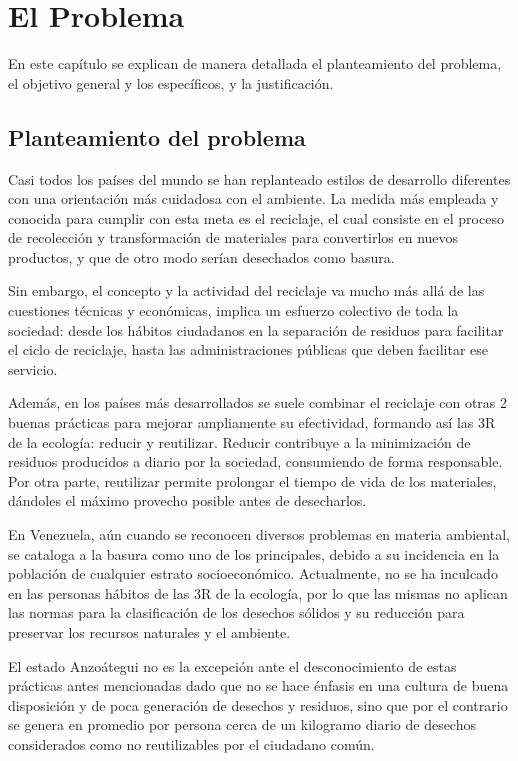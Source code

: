 \vspace*{6cm}
{\setlength{\parskip}{-0.5cm}
\chapter{El Problema}
}
\newpage

En este capítulo se explican de manera detallada el planteamiento del problema, el objetivo general y los específicos, y la justificación.

{\setlength{\parskip}{0cm}

\section{Planteamiento del problema}

Casi todos los países del mundo se han replanteado estilos de desarrollo diferentes con una orientación más cuidadosa con el ambiente. La medida más empleada y conocida para cumplir con esta meta es el reciclaje, el cual consiste en el proceso de recolección y transformación de materiales para convertirlos en nuevos productos, y que de otro modo serían desechados como basura.
}
Sin embargo, el concepto y la actividad del reciclaje va mucho más allá de las cuestiones técnicas y económicas, implica un esfuerzo colectivo de toda la sociedad: desde los hábitos ciudadanos en la separación de residuos para facilitar el ciclo de reciclaje, hasta las administraciones públicas que deben facilitar ese servicio. 

Además, en los países más desarrollados se suele combinar el reciclaje con otras 2 buenas prácticas para mejorar ampliamente su efectividad, formando así las 3R de la ecología: reducir y reutilizar. Reducir contribuye a la minimización de residuos producidos a diario por la sociedad, consumiendo de forma responsable. Por otra parte, reutilizar permite prolongar el tiempo de vida de los materiales, dándoles el máximo provecho posible antes de desecharlos.

En Venezuela, aún cuando se reconocen diversos problemas en materia ambiental, se cataloga a la basura como uno de los principales, debido a su incidencia en la población de cualquier estrato socioeconómico. Actualmente, no se ha inculcado en las personas hábitos de las 3R de la ecología, por lo que las mismas no aplican las normas para la clasificación de los desechos sólidos y su reducción para preservar los recursos naturales y el ambiente.

El estado Anzoátegui no es la excepción ante el desconocimiento de estas prácticas antes mencionadas dado que no se hace énfasis en una cultura de buena disposición y de poca generación de desechos y residuos, sino que por el contrario se genera en promedio por persona cerca de un kilogramo diario de desechos considerados como no reutilizables por el ciudadano común.

